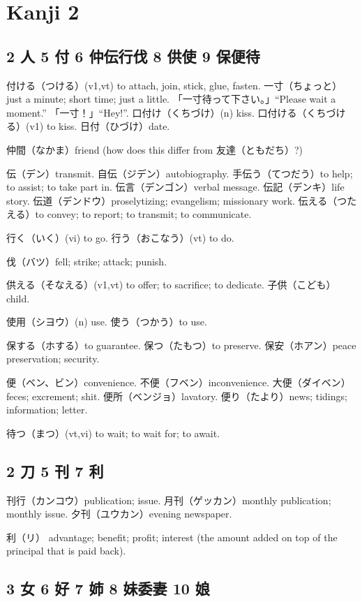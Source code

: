 \chapter{Kanji 2}

\section{2 人 5 付 6 仲伝行伐 8 供使 9 保便待}

付ける（つける）(v1,vt) to attach, join, stick, glue, fasten.
一寸（ちょっと）just a minute; short time; just a little.
「一寸待って下さい。」``Please wait a moment.''
「一寸！」``Hey!''.
口付け（くちづけ）(n) kiss.
口付ける（くちづける）(v1) to kiss.
日付（ひづけ）date.

仲間（なかま）friend (how does this differ from 友達（ともだち）?)

伝（デン）transmit.
自伝（ジデン）autobiography.
手伝う（てつだう）to help; to assist; to take part in.
伝言（デンゴン）verbal message.
伝記（デンキ）life story.
伝道（デンドウ）proselytizing; evangelism; missionary work.
伝える（つたえる）to convey; to report; to transmit; to communicate.

行く（いく）(vi) to go.
行う（おこなう）(vt) to do.

伐（バツ）fell; strike; attack; punish.

供える（そなえる）(v1,vt) to offer; to sacrifice; to dedicate.
子供（こども）child.

使用（シヨウ）(n) use.
使う（つかう）to use.

保する（ホする）to guarantee.
保つ（たもつ）to preserve.
保安（ホアン）peace preservation; security.

便（ベン、ビン）convenience.
不便（フベン）inconvenience.
大便（ダイベン）feces; excrement; shit.
便所（ベンジョ）lavatory.
便り（たより）news; tidings; information; letter.

待つ（まつ）(vt,vi) to wait; to wait for; to await.

\section{2 刀 5 刊 7 利}

刊行（カンコウ）publication; issue.
月刊（ゲッカン）monthly publication; monthly issue.
夕刊（ユウカン）evening newspaper.

利（リ）
advantage; benefit; profit;
interest (the amount added on top of the principal that is paid back).

\section{3 女 6 好 7 姉 8 妹委妻 10 娘}

